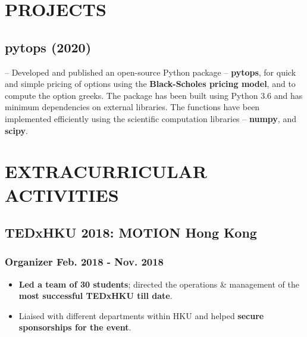 \documentclass{article}
\begin{document}
\vspace{-6mm}
\section{PROJECTS}
\vspace{-3mm}
\subsection{pytops (2020)} -- Developed and published an open-source Python package -- \textbf{pytops}, for quick and simple pricing of options using the \textbf{Black-Scholes pricing model}, and to compute the option greeks. The package has been built using Python 3.6 and has minimum dependencies on external libraries. The functions have been implemented efficiently using the scientific computation libraries -- \textbf{numpy}, and \textbf{scipy}.

\vspace{-2.5mm}



\section{EXTRACURRICULAR ACTIVITIES}
\vspace{-1.5mm}

\subsection{TEDxHKU 2018: MOTION \hspace{4.2in} Hong Kong}
\subsubsection{Organizer \hspace{5.5in} Feb. 2018 - Nov. 2018}
\vspace{-2.9mm}
\begin{itemize}[noitemsep]
\item \textbf{Led a team of 30 students}; directed the operations \& management of the \textbf{most successful TEDxHKU till date}.
\item Liaised with different departments within HKU and helped \textbf{secure sponsorships for the event}.
\end{itemize}
\end{document}
